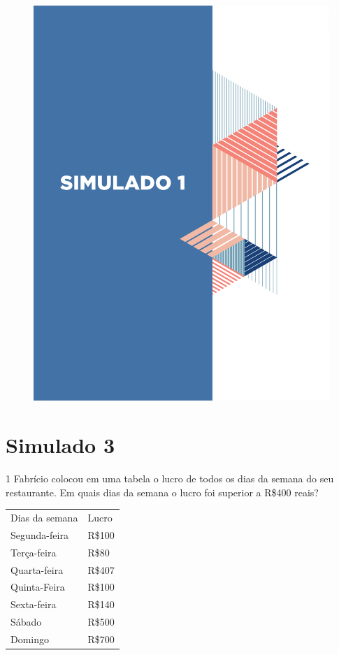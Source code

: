 \begin{figure}
\vspace*{-3cm}
\hspace*{-3.7cm}\includegraphics[scale=1]{../watermarks/1simulado9ano.pdf}
\end{figure}


\pagebreak

\section*{Simulado 3}

\num{1} Fabrício colocou em uma tabela o lucro de todos os dias da semana do
seu restaurante. Em quais dias da semana o lucro foi superior a R\$400
reais?

\begin{longtable}[]{@{}ll@{}}
\toprule
\endhead
Dias da semana & Lucro\tabularnewline
Segunda-feira & R\$100\tabularnewline
Terça-feira & R\$80\tabularnewline
Quarta-feira & R\$407\tabularnewline
Quinta-Feira & R\$100\tabularnewline
Sexta-feira & R\$140\tabularnewline
Sábado & R\$500\tabularnewline
Domingo & R\$700\tabularnewline
\bottomrule
\end{longtable}


